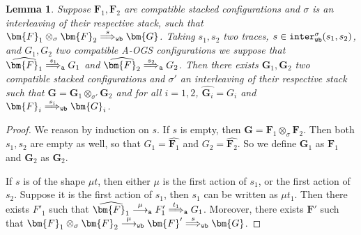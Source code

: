 \documentclass[11pt,a4paper]{amsart}
\theoremstyle{plain}
\theoremstyle{definition}
\theoremstyle{defC}
\theoremstyle{thmC}
\theoremstyle{plain}
\numberwithin{equation}{section}
\newcommand{\tr}{s}
\newcommand{\tracerho}{t}
\newcommand{\stt}{\sigma}
\newcommand{\AOGS}{\mbox{{\rm A-OGS}}\xspace}      %
\newcommand{\rmm}[1]{{\tt{\lowercase{#1}}}}
\newcommand{\genarr}[2]{\mathrel{\stackrel{{#1}}{\longrightarrow}_{\rmm{\lowercase{#2}}}}}
\newcommand{\genArr}[2]{\mathrel{\stackrel{{#1}}{\Longrightarrow}_{\rmm{\lowercase{#2}}}}}  %
\newcommand{\arrA}[1]{\genarr{#1}{A}}  %
\newcommand{\ArrA}[1]{\genArr{#1}{A}}  %
\newcommand{\arrWB}[1]{\genarr{#1}{WB}}           %
\newcommand{\ArrWB}[1]{\genArr{#1}{WB}}          %
\newcommand{\interlWBs}[3]{{\tt inter_{wb}^{#1}}( #2, #3)}
\newcommand{\FF}{F}
\newcommand{\GG}{G}
\newcommand{\FFb}{{\bm{\FF}}} %
\newcommand{\GGb}{{\bm{\GG}}} %
\newcommand{\es}{\eraseStack}
\newcommand{\act}{\mu}
\newcommand{\eraseStack}[1]{\widehat{#1}}
\theoremstyle{plain}
\newtheorem{lemma}[thm]{Lemma}
\theoremstyle{definition}
\begin{document}
\begin{lemma}
  \label{c:lift-atrace-wbtrace}
  Suppose $\FFb_1,\FFb_2$ are compatible stacked configurations
  and $\stt$ is an interleaving of their respective stack,
  such that $\FFb_1 \otimes_{\stt} \FFb_2 \ArrWB{\tr} \GGb$.
  Taking $\tr_1,\tr_2$ two traces, $\tr \in \interlWBs{\stt}{\tr_1}{\tr_2}$,
  and $\GG_1,\GG_2$ two compatible \AOGS configurations
  we suppose that $\es{\FFb_1} \ArrA{\tr_1} \GG_1$
  and $\es{\FFb_2} \ArrA{\tr_2} \GG_2$.
% 
  Then there exists $\GGb_1,\GGb_2$ two compatible stacked configurations
  and $\stt'$ an interleaving of their respective stack such that
  $\GGb = \GGb_1 \otimes_{\stt'} \GGb_2$
  and for all $i=1,2$, 
  $\es{\GGb_i} = \GG_i$
  and 
  $\FFb_i \ArrWB{\tr_i} \GGb_i$.
\end{lemma}

\begin{proof}
We reason by induction on $\tr$.
If $\tr$ is empty, then $\GGb = \FFb_1 \otimes_{\stt} \FFb_2$.
Then both $\tr_1,\tr_2$ are empty as well,
so that $\GG_1 = \es{\FFb_1}$ and $\GG_2 = \es{\FFb_2}$.
So we define $\GGb_1$ as $\FFb_1$ and $\GGb_2$ as $\GGb_2$.

If $\tr$ is of the shape $\act \tracerho$,
then either $\act$ is the first action of $\tr_1$, or the first action of $\tr_2$.
Suppose it is the first action of $\tr_1$, then $\tr_1$
can be written as $\act \tracerho_1$.
Then there exists $\FF'_1$ such that 
$\es{\FFb_1} \arrA{\act} \FF'_1 \ArrA{\tracerho_1} \GG_1$.
Moreover, there exists $\FFb'$
such that $\FFb_1 \otimes_{\stt} \FFb_2 \arrWB{\act} \FFb' \ArrWB{\tr} \GGb$.


\end{proof}
\end{document}
